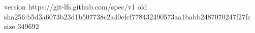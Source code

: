 version https://git-lfs.github.com/spec/v1
oid sha256:b5d3a6073b23d1b507738c2a40efcf778432490573aa1babb2487070247f27fc
size 349692
